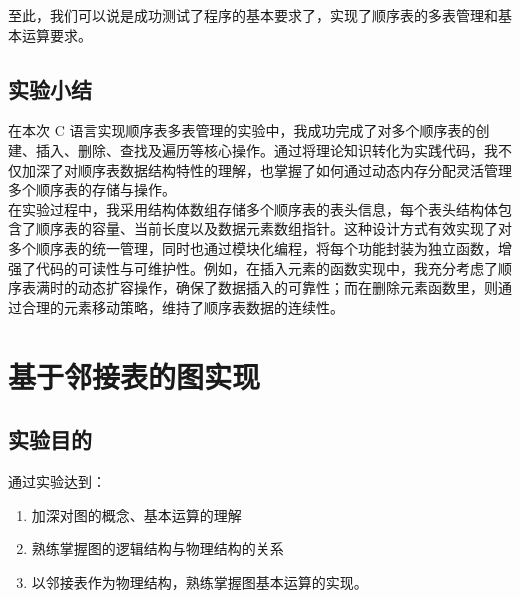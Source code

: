 \documentclass[supercite]{Experimental_Report}
\theoremstyle{definition}
\begin{document}
至此，我们可以说是成功测试了程序的基本要求了，实现了顺序表的多表管理和基本运算要求。
\subsection{实验小结}

在本次 C 语言实现顺序表多表管理的实验中，我成功完成了对多个顺序表的创建、插入、删除、查找及遍历等核心操作。通过将理论知识转化为实践代码，我不仅加深了对顺序表数据结构特性的理解，也掌握了如何通过动态内存分配灵活管理多个顺序表的存储与操作。\\
在实验过程中，我采用结构体数组存储多个顺序表的表头信息，每个表头结构体包含了顺序表的容量、当前长度以及数据元素数组指针。这种设计方式有效实现了对多个顺序表的统一管理，同时也通过模块化编程，将每个功能封装为独立函数，增强了代码的可读性与可维护性。例如，在插入元素的函数实现中，我充分考虑了顺序表满时的动态扩容操作，确保了数据插入的可靠性；而在删除元素函数里，则通过合理的元素移动策略，维持了顺序表数据的连续性。

\newpage

\section{基于邻接表的图实现}

\subsection{实验目的}
通过实验达到：
\begin{enumerate}
	\item	加深对图的概念、基本运算的理解
	\item	熟练掌握图的逻辑结构与物理结构的关系
	\item	以邻接表作为物理结构，熟练掌握图基本运算的实现。
\end{enumerate}
\end{document}
